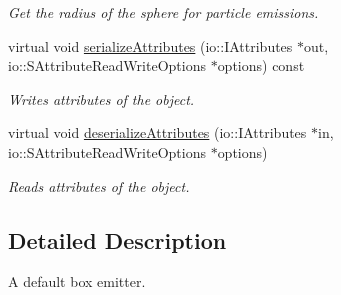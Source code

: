 \begin{DoxyCompactItemize}
\begin{DoxyCompactList}\small\item\em Get the radius of the sphere for particle emissions. \end{DoxyCompactList}\item 
\hypertarget{classirr_1_1scene_1_1_c_particle_sphere_emitter_ae608318e57228348fdf78eb031295135}{virtual void \hyperlink{classirr_1_1scene_1_1_c_particle_sphere_emitter_ae608318e57228348fdf78eb031295135}{serialize\-Attributes} (io\-::\-I\-Attributes $\ast$out, io\-::\-S\-Attribute\-Read\-Write\-Options $\ast$options) const }\label{classirr_1_1scene_1_1_c_particle_sphere_emitter_ae608318e57228348fdf78eb031295135}

\begin{DoxyCompactList}\small\item\em Writes attributes of the object. \end{DoxyCompactList}\item 
\hypertarget{classirr_1_1scene_1_1_c_particle_sphere_emitter_a85a2855df09102d696b7294d06e46978}{virtual void \hyperlink{classirr_1_1scene_1_1_c_particle_sphere_emitter_a85a2855df09102d696b7294d06e46978}{deserialize\-Attributes} (io\-::\-I\-Attributes $\ast$in, io\-::\-S\-Attribute\-Read\-Write\-Options $\ast$options)}\label{classirr_1_1scene_1_1_c_particle_sphere_emitter_a85a2855df09102d696b7294d06e46978}

\begin{DoxyCompactList}\small\item\em Reads attributes of the object. \end{DoxyCompactList}\end{DoxyCompactItemize}


\subsection{Detailed Description}
A default box emitter. 


